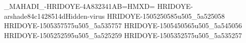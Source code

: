 _MAHADI_-HRIDOYE-4A832341AB=HMXD=
HRIDOYE-arshade84c1428514dHidden-virus
HRIDOYE-1505250585u505_5a525058
HRIDOYE-1505357575u505_5a535757
HRIDOYE-1505450565u505_5a545056
HRIDOYE-1505252595u505_5a525259
HRIDOYE-1505352575u505_5a535257
